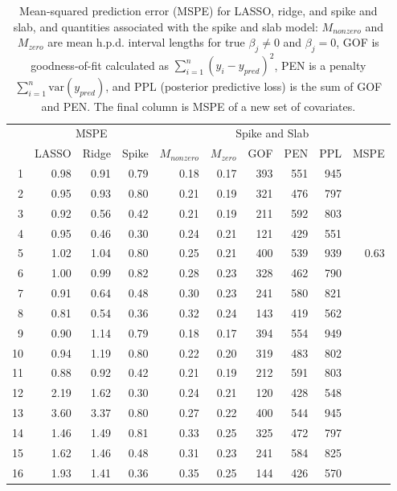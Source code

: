 \documentclass[12pt]{article}
\begin{document}
\begin{table}[ht]
\centering
\begin{tabular}{r|rrr|rrrrrr}
  \hline\hline
 & \multicolumn{3}{c|}{MSPE} & \multicolumn{6}{c}{Spike and Slab} \\
 & LASSO & Ridge & Spike & $M_{nonzero}$ & $M_{zero}$
 & GOF & PEN & PPL & MSPE \\ 
  \hline
 1 & 0.98 & 0.91 & 0.79 & 0.18 & 0.17 & 393 & 551 & 945 &      \\
 2 & 0.95 & 0.93 & 0.80 & 0.21 & 0.19 & 321 & 476 & 797 &      \\ 
 3 & 0.92 & 0.56 & 0.42 & 0.21 & 0.19 & 211 & 592 & 803 &      \\ 
 4 & 0.95 & 0.46 & 0.30 & 0.24 & 0.21 & 121 & 429 & 551 &      \\ 
 5 & 1.02 & 1.04 & 0.80 & 0.25 & 0.21 & 400 & 539 & 939 & 0.63 \\ 
 6 & 1.00 & 0.99 & 0.82 & 0.28 & 0.23 & 328 & 462 & 790 &      \\ 
 7 & 0.91 & 0.64 & 0.48 & 0.30 & 0.23 & 241 & 580 & 821 &      \\ 
 8 & 0.81 & 0.54 & 0.36 & 0.32 & 0.24 & 143 & 419 & 562 &      \\ 
 9 & 0.90 & 1.14 & 0.79 & 0.18 & 0.17 & 394 & 554 & 949 &      \\ 
10 & 0.94 & 1.19 & 0.80 & 0.22 & 0.20 & 319 & 483 & 802 &      \\ 
11 & 0.88 & 0.92 & 0.42 & 0.21 & 0.19 & 212 & 591 & 803 &      \\ 
12 & 2.19 & 1.62 & 0.30 & 0.24 & 0.21 & 120 & 428 & 548 &      \\ 
13 & 3.60 & 3.37 & 0.80 & 0.27 & 0.22 & 400 & 544 & 945 &      \\ 
14 & 1.46 & 1.49 & 0.81 & 0.33 & 0.25 & 325 & 472 & 797 &      \\ 
15 & 1.62 & 1.46 & 0.48 & 0.31 & 0.23 & 241 & 584 & 825 &      \\ 
16 & 1.93 & 1.41 & 0.36 & 0.35 & 0.25 & 144 & 426 & 570 &      \\ 
   \hline\hline
\end{tabular}
\caption{Mean-squared prediction error (MSPE) for LASSO, ridge, and spike and slab, and quantities associated with the spike and slab model: $M_{nonzero}$ and $M_{zero}$ are mean h.p.d. interval lengths for true $\beta_j\neq 0$ and $\beta_j=0$, GOF is goodness-of-fit calculated as $\sum_{i=1}^n(y_i - y_{pred})^2$, PEN is a penalty $\sum_{i=1}^n \mathrm{var}(y_{pred})$, and PPL (posterior predictive loss) is the sum of GOF and PEN. The final column is MSPE of a new set of covariates.}
\end{table}
\end{document}
